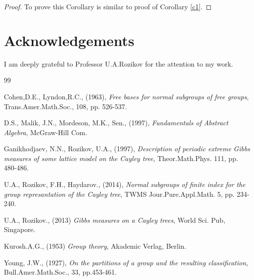 \documentclass[12pt,reqno]{amsart}
\numberwithin{equation}{section}
\begin{document}
\begin{proof} To prove this Corollary is similar to proof of
Corollary \ref{c1}.
\end{proof}

\section*{ \textbf{Acknowledgements}}
I am deeply grateful to Professor U.A.Rozikov for the attention to
my work.

\begin{thebibliography}{99}

 Cohen,D.E., Lyndon,R.C., (1963), {\it Free bases for normal
subgroups of free groups}, Trans.Amer.Math.Soc., 108, pp. 526-537.

 D.S., Malik, J.N., Mordeson, M.K., Sen., (1997), {\it Fundamentals
of Abstract Algebra}, McGraw-Hill Com.

 Ganikhodjaev, N.N., Rozikov, U.A., (1997), {\it Description of
periodic extreme Gibbs measures of some lattice model on the
Cayley tree}, Theor.Math.Phys. 111, pp. 480-486.

 U.A., Rozikov, F.H., Haydarov., (2014), {\it Normal subgroups of
finite index for the group represantation of the Cayley tree},
TWMS Jour.Pure.Appl.Math. 5, pp. 234-240.

 U.A., Rozikov., (2013) {\it Gibbs measures on a Cayley
trees}, World Sci. Pub, Singapore.

 Kurosh.A.G., (1953) {\it Group theory}, Akademic Verlag, Berlin.

 Young, J.W., (1927), {\it On the partitions of a group and the
resulting classification}, Bull.Amer.Math.Soc., 33, pp.453-461.

\end{thebibliography}
\end{document}
